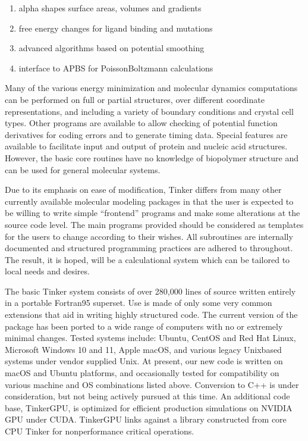 \documentclass[letterpaper,11pt,english]{sphinxmanual}
\begin{document}
\begin{enumerate}
\item {} 
\sphinxAtStartPar
alpha shapes surface areas, volumes and gradients

\item {} 
\sphinxAtStartPar
free energy changes for ligand binding and mutations

\item {} 
\sphinxAtStartPar
advanced algorithms based on potential smoothing

\item {} 
\sphinxAtStartPar
interface to APBS for Poisson\sphinxhyphen{}Boltzmann calculations

\end{enumerate}

\sphinxAtStartPar
Many of the various energy minimization and molecular dynamics computations can be performed on full or partial structures, over different coordinate representations, and including a variety of boundary conditions and crystal cell types. Other programs are available to allow checking of potential function derivatives for coding errors and to generate timing data. Special features are available to facilitate input and output of protein and nucleic acid structures. However, the basic core routines have no knowledge of biopolymer structure and can be used for general molecular systems.

\sphinxAtStartPar
Due to its emphasis on ease of modification, Tinker differs from many other currently available molecular modeling packages in that the user is expected to be willing to write simple “front\sphinxhyphen{}end” programs and make some alterations at the source code level. The main programs provided should be considered as templates for the users to change according to their wishes. All subroutines are internally documented and structured programming practices are adhered to throughout. The result, it is hoped, will be a calculational system which can be tailored to local needs and desires.

\sphinxAtStartPar
The basic Tinker system consists of over 280,000 lines of source written entirely in a portable Fortran95 superset. Use is made of only some very common extensions that aid in writing highly structured code. The current version of the package has been ported to a wide range of computers with no or extremely minimal changes. Tested systems include: Ubuntu, CentOS and Red Hat Linux, Microsoft Windows 10 and 11, Apple macOS, and various legacy Unix\sphinxhyphen{}based systems under vendor supplied Unix. At present, our new code is written on macOS and Ubuntu platforms, and occasionally tested for compatibility on various machine and OS combinations listed above. Conversion to C++ is under consideration, but not being actively pursued at this time. An additional code base, Tinker\sphinxhyphen{}GPU, is optimized for efficient production simulations on NVIDIA GPU under CUDA. Tinker\sphinxhyphen{}GPU links against a library constructed from core CPU Tinker for non\sphinxhyphen{}performance critical operations.
\end{document}
